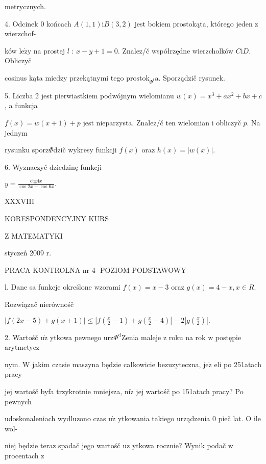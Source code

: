 \documentclass[a4paper,12pt]{article}
\begin{document}
metrycznych.

4. Odcinek $0$ końcach $A(1,1)\mathrm{i}B(3,2)$ jest bokiem prostokąta, którego jeden $\mathrm{z}$ wierzchof-

ków $\mathrm{l}\mathrm{e}\dot{\mathrm{z}}\mathrm{y}$ na prostej $l$ : $x-y+1=0$. Znalez/č współrzędne wierzcholków $C\mathrm{i}D$. Obliczyč

cosinus kąta miedzy przekątnymi tego $\mathrm{p}\mathrm{r}\mathrm{o}\mathrm{s}\mathrm{t}\mathrm{o}\mathrm{k}_{\Phi^{\mathrm{t}}}\mathrm{a}$. Sporządzič rysunek.

5. Liczba 2 jest pierwiastkiem podwójnym wielomianu $w(x)=x^{3}+ax^{2}+bx+c$, a funkcja

$f(x) =w(x+1)+p$ jest nieparzysta. Znalez/č ten wielomian $\mathrm{i}$ obliczyč $p$. Na jednym

rysunku sporz$\Phi$dzič wykresy funkcji $f(x)$ oraz $h(x)=|w(x)|.$

6. Wyznaczyč dziedzinę funkcji

$y=\displaystyle \frac{\mathrm{c}\mathrm{t}\mathrm{g}4x}{\cos 2x+\cos 6x}.$





XXXVIII

KORESPONDENCYJNY KURS

Z MATEMATYKI

styczeń 2009 r.

PRACA KONTROLNA nr 4- POZIOM PODSTAWOWY

l. Dane sa funkcje określone wzorami $f(x)=x-3$ oraz $g(x)=4-x, x\in R.$

Rozwiązač nierównośč

$|f(2x-5)+g(x+1)|\displaystyle \leq|f(\frac{x}{2}-1)+g(\frac{x}{2}-4)|-2|g(\frac{x}{2})|.$

2. Wartośč $\mathrm{u}\dot{\mathrm{z}}$ ytkowa pewnego $\mathrm{u}\mathrm{r}\mathrm{z}\Phi^{\mathrm{d}}$Zenia maleje $\mathrm{z}$ roku na rok $\mathrm{w}$ postępie arytmetycz-

nym. $\mathrm{W}$ jakim czasie maszyna będzie całkowicie bezuzyteczna, $\mathrm{j}\mathrm{e}\dot{\mathrm{z}}$ eli po 251atach pracy

jej wartośč byfa trzykrotnie mniejsza, $\mathrm{n}\mathrm{i}\dot{\mathrm{z}}$ jej wartośč po 151atach pracy? Po pewnych

udoskonaleniach wydluzono czas $\mathrm{u}\dot{\mathrm{z}}$ ytkowania takiego urządzenia $0$ pieč lat. $\mathrm{O}$ ile wol-

niej będzie teraz spadač jego wartośč $\mathrm{u}\dot{\mathrm{z}}$ ytkowa rocznie? Wynik podač $\mathrm{w}$ procentach $\mathrm{z}$
\end{document}

